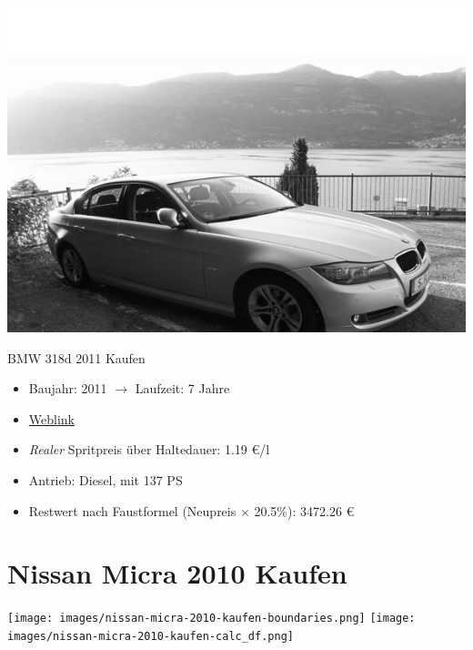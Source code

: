 \documentclass[landscape, DIV=99, 14pt]{scrartcl}
\begin{document}
\pagebreak
\null
\vspace{2cm}
\begin{center}
\includegraphics[width=0.9\columnwidth]{cars/bmw-3er-maximus.png}

BMW 318d 2011 Kaufen
\end{center}

\begin{itemize}
    \item Baujahr: 2011 $\rightarrow$ Laufzeit: 7 Jahre
    \item \href{https://de.wikipedia.org/wiki/BMW_E90}{Weblink}
    \item \emph{Realer} Spritpreis \"uber Haltedauer: 1.19 \euro{}/l
    \item Antrieb: Diesel, mit 137 PS
    \item Restwert nach Faustformel (Neupreis $\times$ 20.5\%): 3472.26 \euro{}
\end{itemize}

\pagebreak


\twocolumn

\section*{Nissan Micra 2010 Kaufen}
\begin{center}
\texttt{[image: images/nissan-micra-2010-kaufen-boundaries.png]}
\null
\vspace{0.5cm}
\texttt{[image: images/nissan-micra-2010-kaufen-calc\_df.png]}
\end{center}
\end{document}
